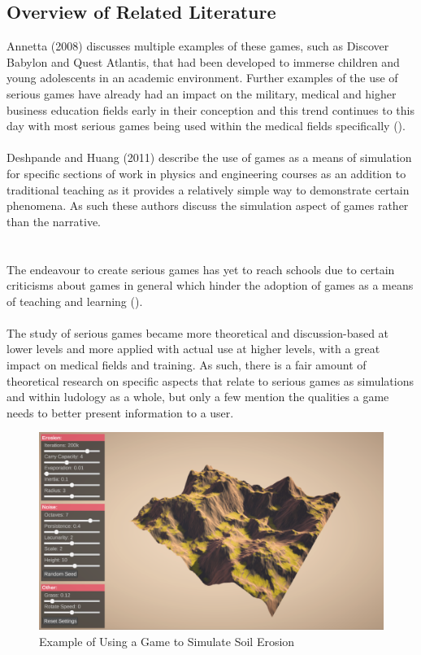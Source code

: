 \subsection{Overview of Related Literature}
Annetta (2008) discusses multiple examples of these games, such as Discover Babylon and Quest Atlantis, that had been developed to immerse children and young adolescents in an academic environment. Further examples of the use of serious games have already had an impact on the military, medical and higher business education fields early in their conception and this trend continues to this day with most serious games being used within the medical fields specifically (\cite{Annetta2008}).
\\\\
Deshpande and Huang (2011) describe the use of games as a means of simulation for specific sections of work in physics and engineering courses as an addition to traditional teaching as it provides a relatively simple way to demonstrate certain phenomena. As such these authors discuss the simulation aspect of games rather than the narrative.
\\\\\\
The endeavour to create serious games has yet to reach schools due to certain criticisms about games in general which hinder the adoption of games as a means of teaching and learning (\cite{Virvou2005}).
\\\\
The study of serious games became more theoretical and discussion-based at lower levels and more applied with actual use at higher levels, with a great impact on medical fields and training. As such, there is a fair amount of theoretical research on specific aspects that relate to serious games as simulations and within ludology as a whole, but only a few mention the qualities a game needs to better present information to a user. 

\begin{figure}[H]
\centering
\includegraphics[scale=0.4]{Figures/soil}
\caption{Example of Using a Game to Simulate Soil Erosion}
\end{figure}

